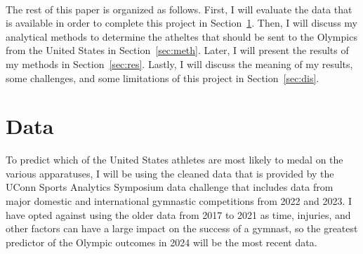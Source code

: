 \documentclass[12pt]{article}
\begin{document}
\\

The rest of this paper is organized as follows. First, I will evaluate the data that is available in order to complete 
this project in Section~\ref{sec:data}. Then, I will discuss my 
analytical methods to determine the atheltes that should be sent to the Olympics from the United States 
in Section~\ref{sec:meth}. Later, I will present the results of my 
methods in Section~\ref{sec:res}. Lastly, I will discuss the meaning of my results, some challenges, 
and some limitations of this project in Section~\ref{sec:dis}.


\section{Data}
\label{sec:data}

To predict which of the United States athletes are most likely to medal on the various apparatuses, 
I will be using the cleaned data that is provided by the UConn Sports Analytics Symposium data challenge 
that includes data from major domestic and international gymnastic competitions from 2022 and 2023. 
I have opted against using the older data from 2017 to 2021 as time, injuries, 
and other factors can have a large impact on the success of a gymnast, so the greatest predictor
of the Olympic outcomes in 2024 will be the most recent data.

\\
\end{document}
